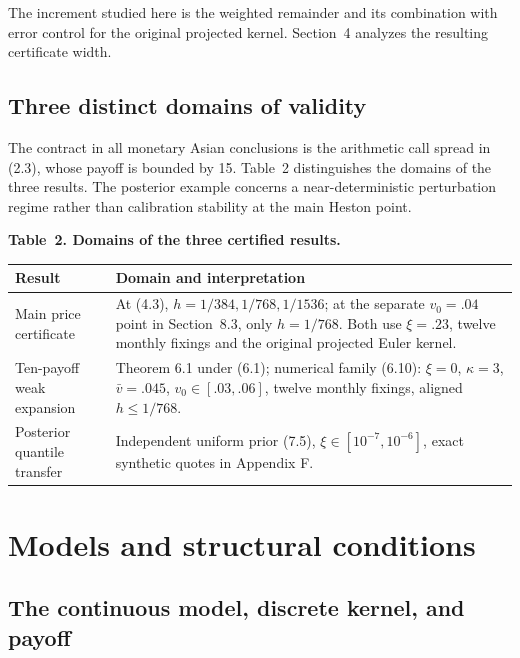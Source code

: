 \documentclass[11pt,a4paper]{article}
\begin{document}
The increment studied here is the weighted remainder and its combination with
error control for the original projected kernel. Section~4 analyzes the resulting
certificate width.

\subsection{Three distinct domains of validity}

The contract in all monetary Asian conclusions is the arithmetic call spread in
(2.3), whose payoff is bounded by 15. Table~2 distinguishes the domains of the
three results. The posterior example concerns a near-deterministic perturbation
regime rather than calibration stability at the main Heston point.

\noindent\textbf{Table~2. Domains of the three certified results.}
\begin{center}
\begin{tabularx}{\textwidth}{@{}l X@{}}
\toprule
Result & Domain and interpretation \\
\midrule
Main price certificate & At (4.3), \(h=1/384,1/768,1/1536\); at the separate \(v_0=.04\) point in Section~8.3, only \(h=1/768\). Both use \(\xi=.23\), twelve monthly fixings and the original projected Euler kernel. \\
Ten-payoff weak expansion & Theorem 6.1 under (6.1); numerical family (6.10): \(\xi=0\), \(\kappa=3\), \(\bar v=.045\), \(v_0\in[.03,.06]\), twelve monthly fixings, aligned \(h\le1/768\). \\
Posterior quantile transfer & Independent uniform prior (7.5), \(\xi\in[10^{-7},10^{-6}]\), exact synthetic quotes in Appendix F. \\
\bottomrule
\end{tabularx}
\end{center}

\section{Models and structural conditions}

\subsection{The continuous model, discrete kernel, and payoff}
\end{document}

